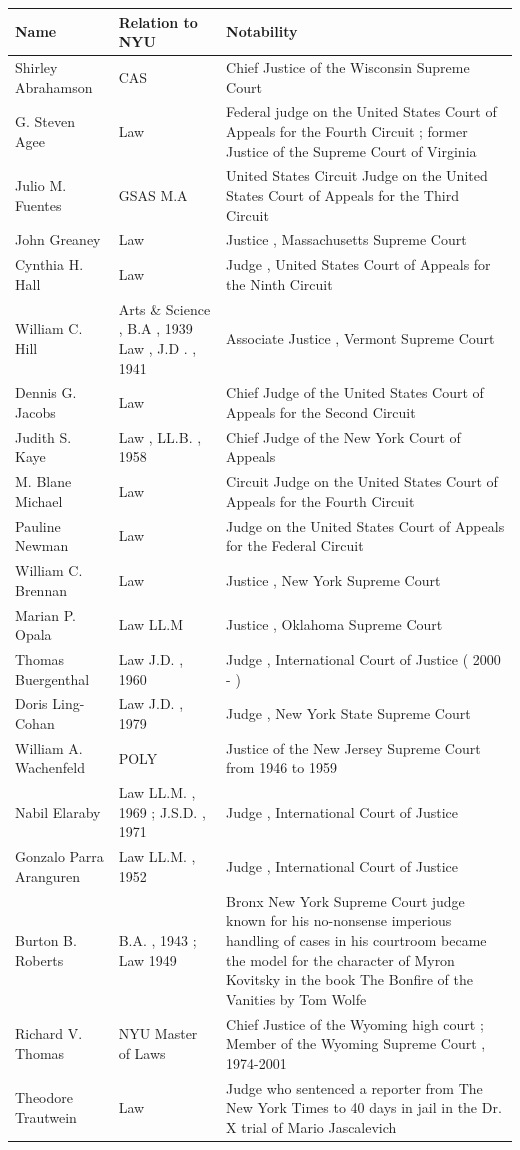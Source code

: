 \documentclass{article}
\begin{document}
\begin{tabular}{lll}
\toprule
Name & Relation to NYU & Notability \\
\midrule
Shirley Abrahamson & CAS & Chief Justice of the Wisconsin Supreme Court \\
G. Steven Agee & Law & Federal judge on the United States Court of Appeals for the Fourth Circuit ; former Justice of the Supreme Court of Virginia \\
Julio M. Fuentes & GSAS M.A & United States Circuit Judge on the United States Court of Appeals for the Third Circuit \\
John Greaney & Law & Justice , Massachusetts Supreme Court \\
Cynthia H. Hall & Law & Judge , United States Court of Appeals for the Ninth Circuit \\
William C. Hill & Arts \& Science , B.A , 1939 Law , J.D . , 1941 & Associate Justice , Vermont Supreme Court \\
Dennis G. Jacobs & Law & Chief Judge of the United States Court of Appeals for the Second Circuit \\
Judith S. Kaye & Law , LL.B. , 1958 & Chief Judge of the New York Court of Appeals \\
M. Blane Michael & Law & Circuit Judge on the United States Court of Appeals for the Fourth Circuit \\
Pauline Newman & Law & Judge on the United States Court of Appeals for the Federal Circuit \\
William C. Brennan & Law & Justice , New York Supreme Court \\
Marian P. Opala & Law LL.M & Justice , Oklahoma Supreme Court \\
Thomas Buergenthal & Law J.D. , 1960 & Judge , International Court of Justice ( 2000 - ) \\
Doris Ling-Cohan & Law J.D. , 1979 & Judge , New York State Supreme Court \\
William A. Wachenfeld & POLY & Justice of the New Jersey Supreme Court from 1946 to 1959 \\
Nabil Elaraby & Law LL.M. , 1969 ; J.S.D. , 1971 & Judge , International Court of Justice \\
Gonzalo Parra Aranguren & Law LL.M. , 1952 & Judge , International Court of Justice \\
Burton B. Roberts & B.A. , 1943 ; Law 1949 & Bronx New York Supreme Court judge known for his no-nonsense imperious handling of cases in his courtroom became the model for the character of Myron Kovitsky in the book The Bonfire of the Vanities by Tom Wolfe \\
Richard V. Thomas & NYU Master of Laws & Chief Justice of the Wyoming high court ; Member of the Wyoming Supreme Court , 1974-2001 \\
Theodore Trautwein & Law & Judge who sentenced a reporter from The New York Times to 40 days in jail in the Dr. X trial of Mario Jascalevich \\
\bottomrule
\end{tabular}
\end{document}
